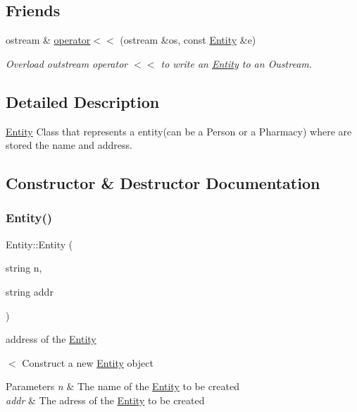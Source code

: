 \subsection*{Friends}
\begin{DoxyCompactItemize}
\item 
ostream \& \hyperlink{classEntity_a985385a6f8478ba830ea909fc233c150}{operator$<$$<$} (ostream \&os, const \hyperlink{classEntity}{Entity} \&e)
\begin{DoxyCompactList}\small\item\em Overload outstream operator $<$$<$ to write an \hyperlink{classEntity}{Entity} to an Oustream. \end{DoxyCompactList}\end{DoxyCompactItemize}


\subsection{Detailed Description}
\hyperlink{classEntity}{Entity} Class that represents a entity(can be a Person or a Pharmacy) where are stored the name and address. 

\subsection{Constructor \& Destructor Documentation}
\mbox{\label{classEntity_ae540a46bdc1983a49127e0ac31884eee}} 
\subsubsection{\texorpdfstring{Entity()}{Entity()}}
{\footnotesize\ttfamily Entity\+::\+Entity (\begin{DoxyParamCaption}\item[{string}]{n,  }\item[{string}]{addr }\end{DoxyParamCaption})}



address of the \hyperlink{classEntity}{Entity} 

$<$ Construct a new \hyperlink{classEntity}{Entity} object


\begin{DoxyParams}{Parameters}
{\em n} & The name of the \hyperlink{classEntity}{Entity} to be created \\
\hline
{\em addr} & The adress of the \hyperlink{classEntity}{Entity} to be created \\
\hline
\end{DoxyParams}


